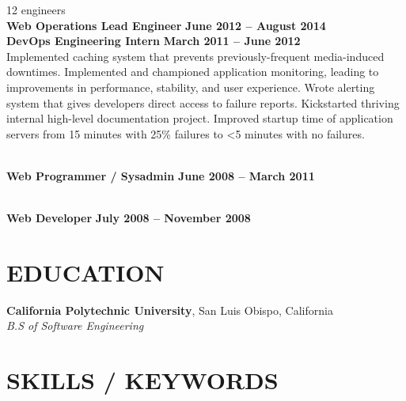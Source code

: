 \documentclass[margin,line]{resume}
\begin{document}
\begin{resume}
     \hfill {\selectfont\texttildelow}12 engineers
    \vspace{1mm}\\%
    \textbf{Web Operations Lead Engineer} \hfill \textbf{June 2012 -- August 2014}\\
    \textbf{DevOps Engineering Intern} \hfill \textbf{March 2011 -- June 2012}\\
    Implemented caching system that prevents previously-frequent media-induced downtimes.
    Implemented and championed application monitoring, leading to improvements in performance, stability, and user experience.
    Wrote alerting system that gives developers direct access to failure reports.
    Kickstarted thriving internal high-level documentation project.
    Improved startup time of application servers from 15 minutes with 25\% failures to \textless5 minutes with no failures.

     \vspace{1mm}\\%
    \textbf{Web Programmer / Sysadmin} \hfill \textbf{June 2008 -- March 2011}

     \vspace{1mm}\\%
    \textbf{Web Developer} \hfill \textbf{July 2008 -- November 2008}

\sectionline

    \section{\mysidestyle \textbf{\large{E}\small{DUCATION}}}

    \textbf{\listing California Polytechnic University}, San Luis Obispo, California \vspace{1mm}\\
    \textsl{B.S of Software Engineering} \vspace{-3mm}\\\vspace{-1mm}%

\sectionline

    \section{\mysidestyle \textbf{\large{S}\small{KILLS} / \large{K}\small{EYWORDS}}}


\end{resume}
\end{document}
